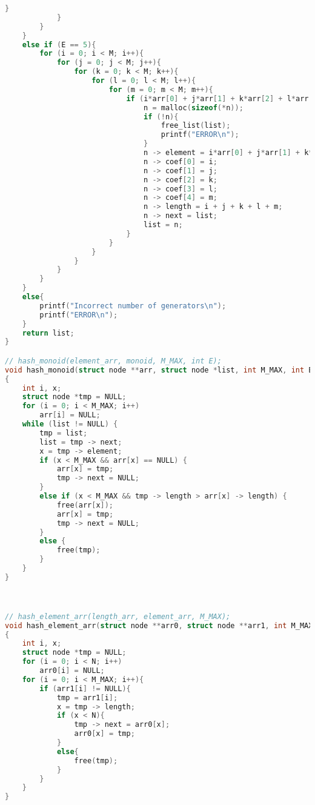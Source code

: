 \begin{lstlisting}[language=C]
                }
            }
        }
    }
    else if (E == 5){
        for (i = 0; i < M; i++){
            for (j = 0; j < M; j++){
                for (k = 0; k < M; k++){
                    for (l = 0; l < M; l++){
                        for (m = 0; m < M; m++){
                            if (i*arr[0] + j*arr[1] + k*arr[2] + l*arr[3] + m*arr[4] < M_MAX){
                                n = malloc(sizeof(*n));
                                if (!n){
                                    free_list(list);
                                    printf("ERROR\n");
                                }
                                n -> element = i*arr[0] + j*arr[1] + k*arr[2] + l*arr[3] + m*arr[4];
                                n -> coef[0] = i;
                                n -> coef[1] = j;
                                n -> coef[2] = k;
                                n -> coef[3] = l;
                                n -> coef[4] = m;
                                n -> length = i + j + k + l + m;
                                n -> next = list;
                                list = n;
                            }
                        }
                    }
                }
            }
        }
    }
    else{
        printf("Incorrect number of generators\n");
        printf("ERROR\n");
    }
    return list;
}

// hash_monoid(element_arr, monoid, M_MAX, int E);
void hash_monoid(struct node **arr, struct node *list, int M_MAX, int E)
{
    int i, x;
    struct node *tmp = NULL;
    for (i = 0; i < M_MAX; i++)
        arr[i] = NULL;
    while (list != NULL) {
        tmp = list;
        list = tmp -> next;
        x = tmp -> element;
        if (x < M_MAX && arr[x] == NULL) {
            arr[x] = tmp;
            tmp -> next = NULL;
        }
        else if (x < M_MAX && tmp -> length > arr[x] -> length) {
            free(arr[x]);
            arr[x] = tmp;
            tmp -> next = NULL;
        }
        else {
            free(tmp);
        }
    }
}



// hash_element_arr(length_arr, element_arr, M_MAX);
void hash_element_arr(struct node **arr0, struct node **arr1, int M_MAX)
{
    int i, x;
    struct node *tmp = NULL;
    for (i = 0; i < N; i++)
        arr0[i] = NULL;
    for (i = 0; i < M_MAX; i++){
        if (arr1[i] != NULL){
            tmp = arr1[i];
            x = tmp -> length;
            if (x < N){
                tmp -> next = arr0[x];
                arr0[x] = tmp;
            }
            else{
                free(tmp);
            }
        }
    }
}


\end{lstlisting}
